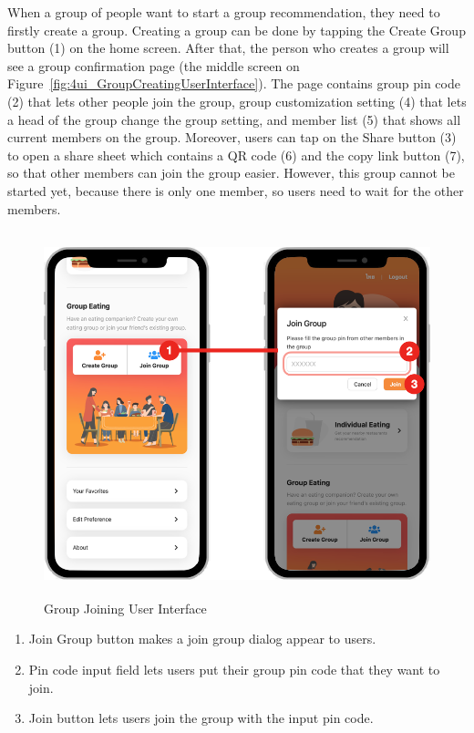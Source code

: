 \documentclass[12pt,oneside,openright,a4paper]{cpe-english-project}
\begin{document}
When a group of people want to start a group recommendation, they need to firstly create a group. Creating a group can be done by tapping the Create Group button (1) on the home screen. After that, the person who creates a group will see a group confirmation page (the middle screen on Figure~\ref{fig:4ui_GroupCreatingUserInterface}). The page contains group pin code (2) that lets other people join the group, group customization setting (4) that lets a head of the group change the group setting, and member list (5) that shows all current members on the group. Moreover, users can tap on the Share button (3) to open a share sheet which contains a QR code (6) and the copy link button (7), so that other members can join the group easier. However, this group cannot be started yet, because there is only one member, so users need to wait for the other members.
\begin{figure}[H]\centering
\includegraphics[height=300pt]{./images/4ui_GroupJoiningUserInterface.png}
\caption{Group Joining User Interface}\label{fig:4ui_GroupJoiningUserInterface}
\end{figure}

\begin{enumerate}
\item Join Group button makes a join group dialog appear to users.
\item Pin code input field lets users put their group pin code that they want to join.
\item Join button lets users join the group with the input pin code.
\end{enumerate}
\end{document}
